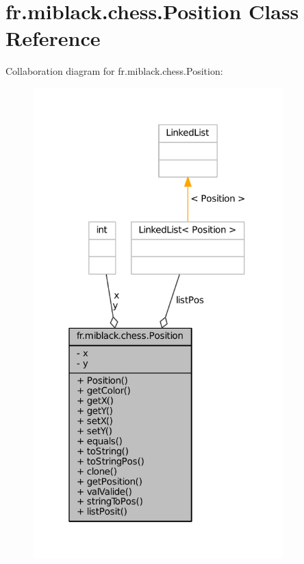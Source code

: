 \section{fr.\-miblack.\-chess.\-Position Class Reference}
\label{classfr_1_1miblack_1_1chess_1_1Position}


Collaboration diagram for fr.\-miblack.\-chess.\-Position\-:
\nopagebreak
\begin{figure}[H]
\begin{center}
\leavevmode
\includegraphics[width=274pt]{classfr_1_1miblack_1_1chess_1_1Position__coll__graph}
\end{center}
\end{figure}
